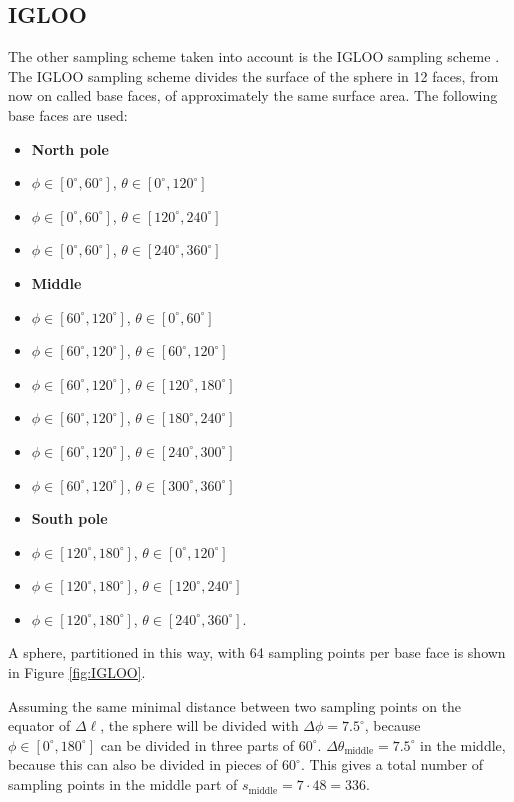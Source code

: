 \subsection{IGLOO}
The other sampling scheme taken into account is the IGLOO sampling scheme \cite{Zhang2012575}.
The IGLOO sampling scheme divides the surface of the sphere in 12 faces, from now on called base faces, of approximately the same surface area.
The following base faces are used:
\begin{multicols}{2}
\begin{itemize}
\item[]\textbf{North pole}
\item $\phi\in[0^\circ,60^\circ]$, $\theta\in[0^\circ,120^\circ]$
\item $\phi\in[0^\circ,60^\circ]$, $\theta\in[120^\circ,240^\circ]$
\item $\phi\in[0^\circ,60^\circ]$, $\theta\in[240^\circ,360^\circ]$
\item[]\textbf{Middle}
\item $\phi\in[60^\circ,120^\circ]$, $\theta\in[0^\circ,60^\circ]$
\item $\phi\in[60^\circ,120^\circ]$, $\theta\in[60^\circ,120^\circ]$
\item $\phi\in[60^\circ,120^\circ]$, $\theta\in[120^\circ,180^\circ]$
\item $\phi\in[60^\circ,120^\circ]$, $\theta\in[180^\circ,240^\circ]$
\item $\phi\in[60^\circ,120^\circ]$, $\theta\in[240^\circ,300^\circ]$
\item $\phi\in[60^\circ,120^\circ]$, $\theta\in[300^\circ,360^\circ]$
\item[]\textbf{South pole}
\item $\phi\in[120^\circ,180^\circ]$, $\theta\in[0^\circ,120^\circ]$
\item $\phi\in[120^\circ,180^\circ]$, $\theta\in[120^\circ,240^\circ]$
\item $\phi\in[120^\circ,180^\circ]$, $\theta\in[240^\circ,360^\circ]$.
\end{itemize}
\end{multicols}
A sphere, partitioned in this way, with 64 sampling points per base face is shown in Figure \ref{fig:IGLOO}.

Assuming the same minimal distance between two sampling points on the equator of $\Delta\ell$, the sphere will be divided with $\Delta\phi=7.5^\circ$, because $\phi\in[0^\circ,180^\circ]$ can be divided in three parts of $60^\circ$.
$\Delta\theta_\text{middle}=7.5^\circ$ in the middle, because this can also be divided in pieces of $60^\circ$.
This gives a total number of sampling points in the middle part of $s_\text{middle}=7\cdot48=336$.

